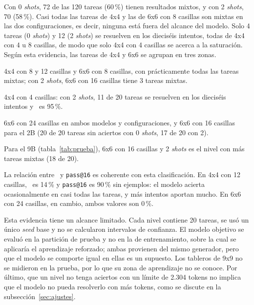 Con 0 \emph{shots}, 72 de las 120 tareas (60\,\%) tienen resultados mixtos, y
con 2 \emph{shots}, 70 (58\,\%). Casi todas las tareas de 4x4 y las de 6x6 con 8
casillas son mixtas en las dos configuraciones, es decir, ninguna está fuera del
alcance del modelo. Solo 4 tareas (0 \emph{shots}) y 12 (2 \emph{shots}) se
resuelven en los dieciséis intentos, todas de 4x4 con 4 u 8 casillas, de modo que
solo 4x4 con 4 casillas se acerca a la saturación. Según esta evidencia, las
tareas de 4x4 y 6x6 se agrupan en tres zonas.
\begin{description}[leftmargin=0pt]
  \item[Zona aprendible:] 4x4 con 8 y 12 casillas y 6x6 con 8 casillas, con
  prácticamente todas las tareas mixtas; con 2 \emph{shots}, 6x6 con 16 casillas
  tiene 3 tareas mixtas.
  \item[Casi saturada:] 4x4 con 4 casillas: con 2 \emph{shots}, 11 de 20 tareas
  se resuelven en los dieciséis intentos y \passuno\ es 95\,\%.
  \item[Sin aciertos observados:] 6x6 con 24 casillas en ambos modelos y
  configuraciones, y 6x6 con 16 casillas para el 2B (20 de 20 tareas sin
  aciertos con 0 \emph{shots}, 17 de 20 con 2).
\end{description}
Para el 9B (tabla~\ref{tab:prueba}), 6x6 con 16 casillas y 2 \emph{shots} es el
nivel con más tareas mixtas (18 de 20).

La relación entre \passuno\ y \texttt{pass@16} es coherente con esta
clasificación. En 4x4 con 12 casillas, \passuno\ es 14\,\% y \texttt{pass@16} es
90\,\% sin ejemplos: el modelo acierta ocasionalmente en casi todas las tareas, y
más intentos aportan mucho. En 6x6 con 24 casillas, en cambio, ambos valores son
0\,\%.

Esta evidencia tiene un alcance limitado. Cada nivel contiene 20 tareas, se usó un
único \emph{seed} base y no se calcularon intervalos de confianza. El modelo
objetivo se evaluó en la partición de prueba y no en la de entrenamiento, sobre la
cual se aplicaría el aprendizaje reforzado; ambas provienen del mismo generador,
pero que el modelo se comporte igual en ellas es un supuesto. Los tableros de 9x9
no se midieron en la prueba, por lo que su zona de aprendizaje no se conoce. Por
último, que un nivel no tenga aciertos con un límite de 2.304 tokens no implica
que el modelo no pueda resolverlo con más tokens, como se discute en la
subsección~\ref{sec:ajustes}.

